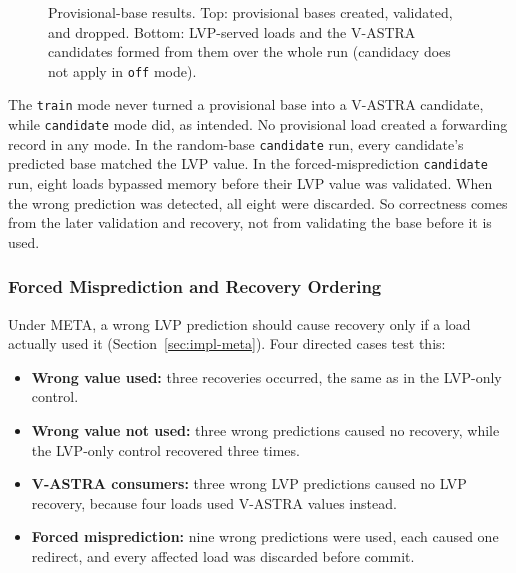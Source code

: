 \begin{figure}[H]
    \vspace{0.2em}


    \caption{Provisional-base results. Top: provisional bases
    created, validated, and dropped. Bottom: LVP-served loads
    and the V-ASTRA candidates formed from them over the whole run
    (candidacy does not apply in \texttt{off} mode).}
    \label{tab:meta-provisional-results}
\end{figure}

The \texttt{train} mode never turned a provisional base into a V-ASTRA
candidate, while \texttt{candidate} mode did, as intended. No
provisional load created a forwarding record in any mode. In the
random-base \texttt{candidate} run, every candidate's predicted base
matched the LVP value. In the forced-misprediction \texttt{candidate}
run, eight loads bypassed memory before their LVP value was
validated. When the wrong prediction was detected, all eight were
discarded. So correctness comes from the later validation and
recovery, not from validating the base before it is used.

\subsubsection{Forced Misprediction and Recovery Ordering}
\label{subsubsec:meta-forced-misprediction-recovery}

Under META, a wrong LVP prediction should cause recovery only if a
load actually used it (Section~\ref{sec:impl-meta}). Four directed
cases test this:
\begin{itemize}
    \item \textbf{Wrong value used:} three recoveries occurred, the
    same as in the LVP-only control.
    \item \textbf{Wrong value not used:} three wrong predictions
    caused no recovery, while the LVP-only control recovered three
    times.
    \item \textbf{V-ASTRA consumers:} three wrong LVP predictions
    caused no LVP recovery, because four loads used V-ASTRA values
    instead.
    \item \textbf{Forced misprediction:} nine wrong predictions were
    used, each caused one redirect, and every affected load was
    discarded before commit.
\end{itemize}

